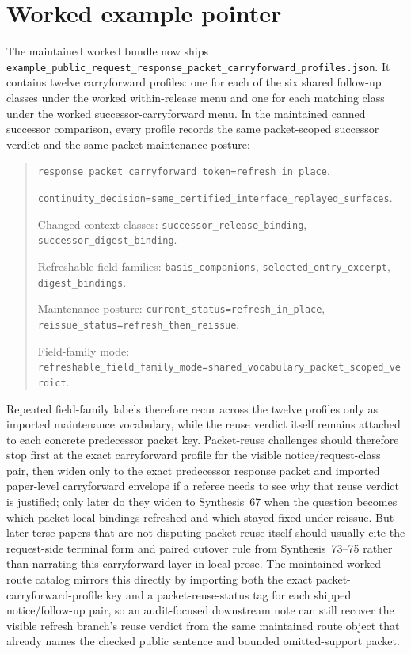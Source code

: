\documentclass[11pt]{article}
\begin{document}
\section{Worked example pointer}
The maintained worked bundle now ships \nolinkurl{example_public_request_response_packet_carryforward_profiles.json}.\cite{series:workedexample}
It contains twelve carryforward profiles: one for each of the six shared follow-up classes under the worked within-release menu and one for each matching class under the worked successor-carryforward menu.
In the maintained canned successor comparison, every profile records the same packet-scoped successor verdict and the same packet-maintenance posture:
\begin{quote}\small
\nolinkurl{response_packet_carryforward_token=refresh_in_place}.\par
\nolinkurl{continuity_decision=same_certified_interface_replayed_surfaces}.\par
Changed-context classes: \nolinkurl{successor_release_binding}, \nolinkurl{successor_digest_binding}.\par
Refreshable field families: \nolinkurl{basis_companions}, \nolinkurl{selected_entry_excerpt}, \nolinkurl{digest_bindings}.\par
Maintenance posture: \nolinkurl{current_status=refresh_in_place}, \nolinkurl{reissue_status=refresh_then_reissue}.\par
Field-family mode: \nolinkurl{refreshable_field_family_mode=shared_vocabulary_packet_scoped_verdict}.
\end{quote}
Repeated field-family labels therefore recur across the twelve profiles only as imported maintenance vocabulary, while the reuse verdict itself remains attached to each concrete predecessor packet key.
Packet-reuse challenges should therefore stop first at the exact carryforward profile for the visible notice/request-class pair, then widen only to the exact predecessor response packet and imported paper-level carryforward envelope if a referee needs to see why that reuse verdict is justified; only later do they widen to Synthesis~67 when the question becomes which packet-local bindings refreshed and which stayed fixed under reissue.\cite{series:publicrequestresponsepacketdeltas}
But later terse papers that are not disputing packet reuse itself should usually cite the request-side terminal form and paired cutover rule from Synthesis~73--75 rather than narrating this carryforward layer in local prose. The maintained worked route catalog mirrors this directly by importing both the exact packet-carryforward-profile key and a packet-reuse-status tag for each shipped notice/follow-up pair, so an audit-focused downstream note can still recover the visible refresh branch's reuse verdict from the same maintained route object that already names the checked public sentence and bounded omitted-support packet.
\end{document}

